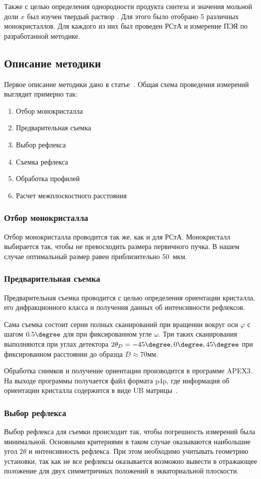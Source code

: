 Также с целью определения однородности продукта синтеза и значения мольной доли $x$ был изучен твердый раствор \YEu.
Для этого было отобрано 5 различных монокристаллов.
Для каждого из них был проведен РСтА и измерение ПЭЯ по разработанной методике.

\subsection{Описание методики}

Первое описание методики дано в статье~\cite{Kudryavtsev:2024:YEu}.
Общая схема проведения измерений выглядит примерно так:
\begin{enumerate}
    \item Отбор монокристалла
    \item Предварительная съемка
    \item Выбор рефлекса
    \item Съемка рефлекса
    \item Обработка профилей
    \item Расчет межплоскостного расстояния
\end{enumerate}
\subsubsection{Отбор монокристалла}
Отбор монокристалла проводится так же, как и для РСтА.
Монокристалл выбирается так, чтобы не превосходить размера первичного пучка.
В нашем случае оптимальный размер равен приблизительно 50~мкм.
\subsubsection{Предварительная съемка}
Предварительная съемка проводится с целью определения ориентации кристалла, его дифракционного класса и получения данных об интенсивности рефлексов.

Сама съемка состоит серии полных сканирований при вращении вокруг оси $\varphi$ с шагом $0.5\degree$ для при фиксированном угле $\omega$.
Три таких сканирования выполняются при углах детектора $2\theta_D = -45\degree, 0\degree, 45\degree$ при фиксированном расстоянии до образца $D \approx 70\unit{мм}$.

Обработка снимков и получение ориентации производится в программе APEX3.
На выходе программы получается файл формата p4p, где информация об ориентации кристалла содержится в виде UB матрицы~\cite{Busing:1967}.
\subsubsection{Выбор рефлекса}
Выбор рефлекса для съемки происходит так, чтобы погрешность измерений была минимальной.
Основными критериями в таком случае оказываются наибольшие угол $2\theta$ и интенсивность рефлекса.
При этом необходимо учитывать геометрию установки, так как не все рефлексы оказывается возможно вывести в отражающее положение для двух симметричных положений в экваториальной плоскости.

